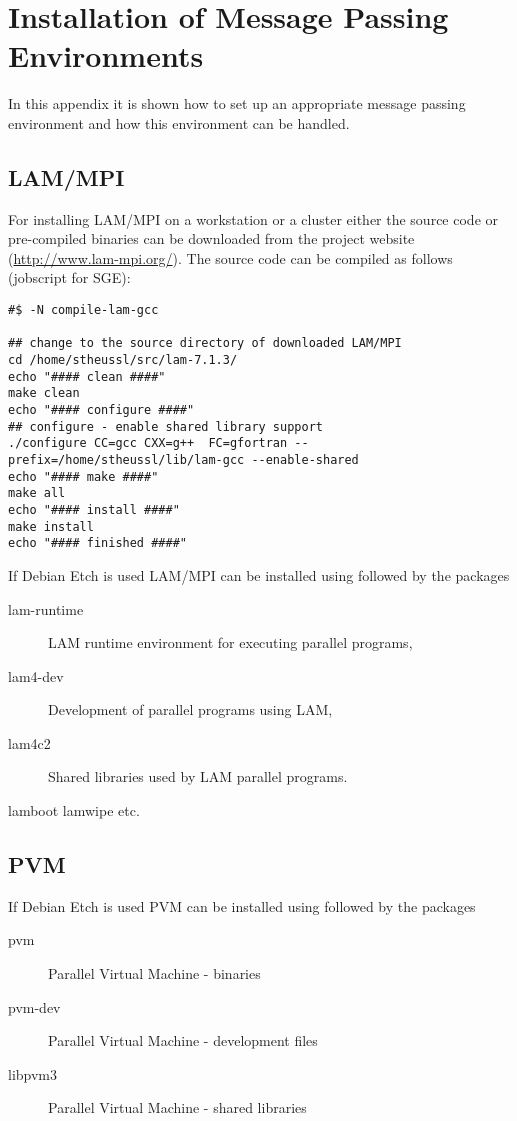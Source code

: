 
\section{Installation of Message Passing Environments}
\label{app:mpi_imp}

In this appendix it is shown how to set up an appropriate message
passing environment and how this environment can be handled.

\subsection{LAM/MPI}

For installing LAM/MPI on a workstation or a cluster
either the source code or pre-compiled binaries can be downloaded from
the project website (\url{http://www.lam-mpi.org/}).
The source code can be compiled as follows (jobscript for SGE):

\begin{verbatim}
#$ -N compile-lam-gcc

## change to the source directory of downloaded LAM/MPI
cd /home/stheussl/src/lam-7.1.3/
echo "#### clean ####"
make clean
echo "#### configure ####"
## configure - enable shared library support
./configure CC=gcc CXX=g++  FC=gfortran --prefix=/home/stheussl/lib/lam-gcc --enable-shared
echo "#### make ####"
make all
echo "#### install ####"
make install
echo "#### finished ####"
\end{verbatim}

If Debian Etch is used LAM/MPI can be installed using  followed by the packages

\begin{description}
\item[lam-runtime] LAM runtime environment for executing parallel programs,
\item[lam4-dev] Development of parallel programs using LAM,
\item[lam4c2] Shared libraries used by LAM parallel programs.
\end{description}

lamboot lamwipe etc.




\subsection{PVM}



If Debian Etch is used PVM can be installed using  followed by the packages

\begin{description}
\item[pvm] Parallel Virtual Machine - binaries 
\item[pvm-dev] Parallel Virtual Machine - development files
\item[libpvm3] Parallel Virtual Machine - shared libraries
\end{description}
